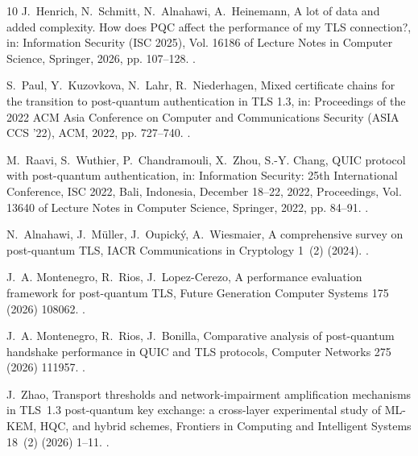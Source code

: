 \documentclass[preprint,12pt]{elsarticle}
\begin{document}
\begin{thebibliography}{10}
J.~Henrich, N.~Schmitt, N.~Alnahawi, A.~Heinemann, A lot of data and added
  complexity. How does {PQC} affect the performance of my {TLS} connection?, in:
  Information Security (ISC 2025), Vol. 16186 of Lecture Notes in Computer
  Science, Springer, 2026, pp. 107--128.
\newblock \href {https://doi.org/10.1007/978-3-032-08124-7_6}
  {}.

S.~Paul, Y.~Kuzovkova, N.~Lahr, R.~Niederhagen, Mixed certificate chains for the
  transition to post-quantum authentication in {TLS} 1.3, in: Proceedings of the
  2022 ACM Asia Conference on Computer and Communications Security (ASIA CCS
  '22), ACM, 2022, pp. 727--740.
\newblock \href {https://doi.org/10.1145/3488932.3497755}
  {}.

M.~Raavi, S.~Wuthier, P.~Chandramouli, X.~Zhou, S.-Y. Chang, {QUIC} protocol
  with post-quantum authentication, in: Information Security: 25th
  International Conference, ISC 2022, Bali, Indonesia, December 18--22, 2022,
  Proceedings, Vol. 13640 of Lecture Notes in Computer Science, Springer, 2022,
  pp. 84--91.
\newblock \href {https://doi.org/10.1007/978-3-031-22390-7_6}
  {}.

N.~Alnahawi, J.~M{\"u}ller, J.~Oupick{\'y}, A.~Wiesmaier, A comprehensive survey
  on post-quantum {TLS}, IACR Communications in Cryptology 1~(2) (2024).
\newblock \href {https://doi.org/10.62056/ahee0iuc}
  {}.

J.~A. Montenegro, R.~Rios, J.~Lopez-Cerezo, A performance evaluation framework
  for post-quantum {TLS}, Future Generation Computer Systems 175 (2026) 108062.
\newblock \href {https://doi.org/10.1016/j.future.2025.108062}
  {}.

J.~A. Montenegro, R.~Rios, J.~Bonilla, Comparative analysis of post-quantum
  handshake performance in {QUIC} and {TLS} protocols, Computer Networks 275
  (2026) 111957.
\newblock \href {https://doi.org/10.1016/j.comnet.2025.111957}
  {}.

J.~Zhao, Transport thresholds and network-impairment amplification mechanisms
  in {TLS}~1.3 post-quantum key exchange: a cross-layer experimental study of
  {ML-KEM}, {HQC}, and hybrid schemes, Frontiers in Computing and Intelligent
  Systems 18~(2) (2026) 1--11.
\newblock \href {https://doi.org/10.54097/wyn6tw24}
  {}.


\end{thebibliography}
\end{document}
